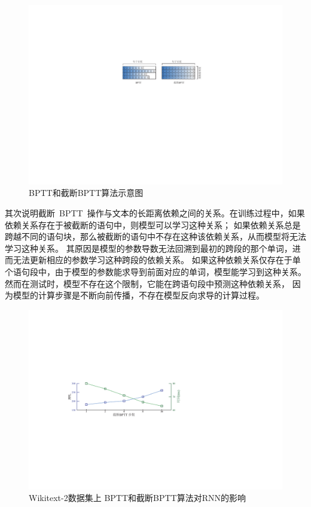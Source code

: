 \begin{figure}[!t]
  \centering
  \includegraphics[width=.75\columnwidth]{./figures/minibatch.pdf}
  \caption{BPTT和截断BPTT算法示意图}\label{fig:minibatch}
\end{figure}

其次说明截断~BPTT~操作与文本的长距离依赖之间的关系。在训练过程中，如果依赖关系存在于被截断的语句中，则模型可以学习这种关系； 如果依赖关系总是跨越不同的语句块，那么被截断的语句中不存在这种该依赖关系，从而模型将无法学习这种关系。 其原因是模型的参数导数无法回溯到最初的跨段的那个单词，进而无法更新相应的参数学习这种跨段的依赖关系。
如果这种依赖关系仅存在于单个语句段中，由于模型的参数能求导到前面对应的单词，模型能学习到这种关系。
然而在测试时，模型不存在这个限制，它能在跨语句段中预测这种依赖关系， 因为模型的计算步骤是不断向前传播，不存在模型反向求导的计算过程。
\begin{figure}[!ht]
  \centering
  \includegraphics[width=.85\columnwidth]{./figures/tbptt.pdf}
  \caption{Wikitext-2数据集上 BPTT和截断BPTT算法对RNN的影响}\label{fig:tbptt}
\end{figure}

